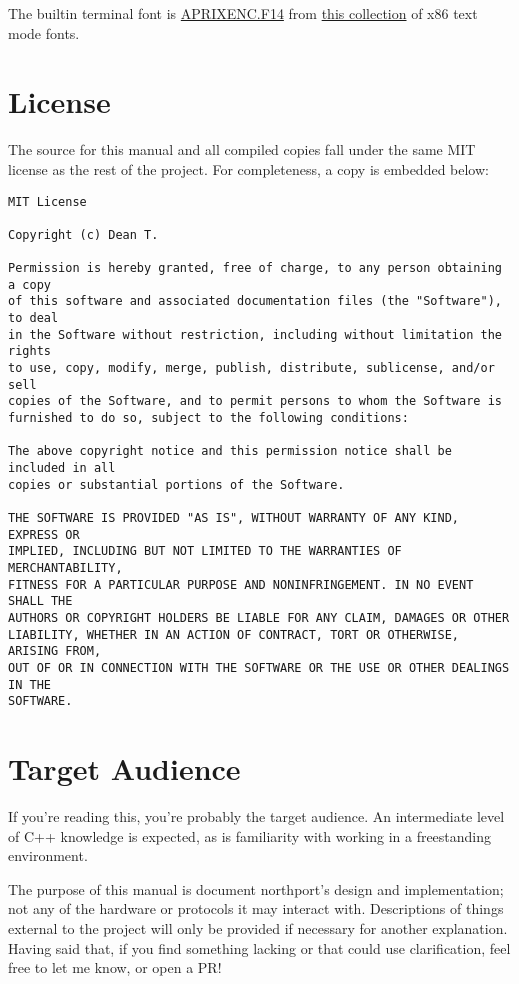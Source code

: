 The builtin terminal font is \href{https://github.com/viler-int10h/vga-text-mode-fonts/blob/master/FONTS/NON-PC/APRIXENC.F14}{APRIXENC.F14} from \href{https://github.com/viler-int10h/vga-text-mode-fonts}{this collection} of x86 text mode fonts.

\section{License}

The source for this manual and all compiled copies fall under the same MIT license as the rest of the project. For completeness, a copy is embedded below:

\begin{verbatim}
MIT License

Copyright (c) Dean T.

Permission is hereby granted, free of charge, to any person obtaining a copy
of this software and associated documentation files (the "Software"), to deal
in the Software without restriction, including without limitation the rights
to use, copy, modify, merge, publish, distribute, sublicense, and/or sell
copies of the Software, and to permit persons to whom the Software is
furnished to do so, subject to the following conditions:

The above copyright notice and this permission notice shall be included in all
copies or substantial portions of the Software.

THE SOFTWARE IS PROVIDED "AS IS", WITHOUT WARRANTY OF ANY KIND, EXPRESS OR
IMPLIED, INCLUDING BUT NOT LIMITED TO THE WARRANTIES OF MERCHANTABILITY,
FITNESS FOR A PARTICULAR PURPOSE AND NONINFRINGEMENT. IN NO EVENT SHALL THE
AUTHORS OR COPYRIGHT HOLDERS BE LIABLE FOR ANY CLAIM, DAMAGES OR OTHER
LIABILITY, WHETHER IN AN ACTION OF CONTRACT, TORT OR OTHERWISE, ARISING FROM,
OUT OF OR IN CONNECTION WITH THE SOFTWARE OR THE USE OR OTHER DEALINGS IN THE
SOFTWARE.
\end{verbatim}

\section{Target Audience}
If you're reading this, you're probably the target audience. An intermediate level of C++ knowledge is expected, as is familiarity with working in a freestanding environment.

The purpose of this manual is document northport's design and implementation; not any of the hardware or protocols it may interact with. Descriptions of things external to the project will only be provided if necessary for another explanation.
Having said that, if you find something lacking or that could use clarification, feel free to let me know, or open a PR!

